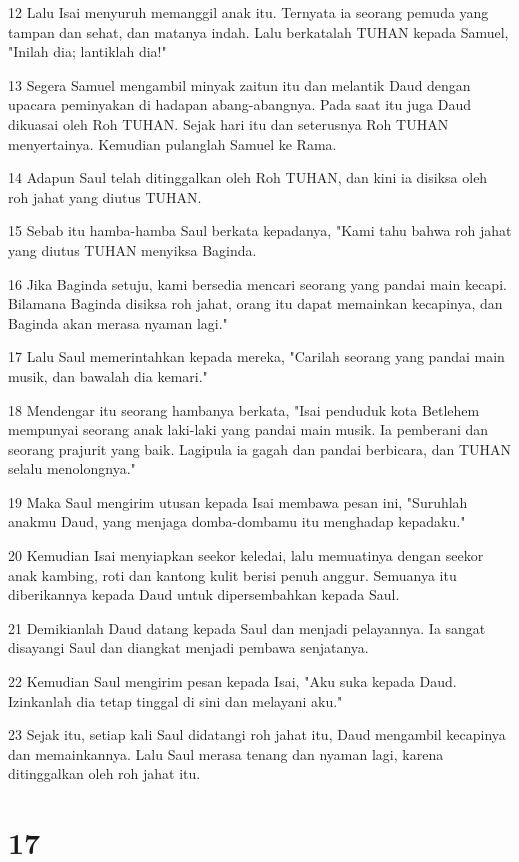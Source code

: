 \par 12 Lalu Isai menyuruh memanggil anak itu. Ternyata ia seorang pemuda yang tampan dan sehat, dan matanya indah. Lalu berkatalah TUHAN kepada Samuel, "Inilah dia; lantiklah dia!"
\par 13 Segera Samuel mengambil minyak zaitun itu dan melantik Daud dengan upacara peminyakan di hadapan abang-abangnya. Pada saat itu juga Daud dikuasai oleh Roh TUHAN. Sejak hari itu dan seterusnya Roh TUHAN menyertainya. Kemudian pulanglah Samuel ke Rama.
\par 14 Adapun Saul telah ditinggalkan oleh Roh TUHAN, dan kini ia disiksa oleh roh jahat yang diutus TUHAN.
\par 15 Sebab itu hamba-hamba Saul berkata kepadanya, "Kami tahu bahwa roh jahat yang diutus TUHAN menyiksa Baginda.
\par 16 Jika Baginda setuju, kami bersedia mencari seorang yang pandai main kecapi. Bilamana Baginda disiksa roh jahat, orang itu dapat memainkan kecapinya, dan Baginda akan merasa nyaman lagi."
\par 17 Lalu Saul memerintahkan kepada mereka, "Carilah seorang yang pandai main musik, dan bawalah dia kemari."
\par 18 Mendengar itu seorang hambanya berkata, "Isai penduduk kota Betlehem mempunyai seorang anak laki-laki yang pandai main musik. Ia pemberani dan seorang prajurit yang baik. Lagipula ia gagah dan pandai berbicara, dan TUHAN selalu menolongnya."
\par 19 Maka Saul mengirim utusan kepada Isai membawa pesan ini, "Suruhlah anakmu Daud, yang menjaga domba-dombamu itu menghadap kepadaku."
\par 20 Kemudian Isai menyiapkan seekor keledai, lalu memuatinya dengan seekor anak kambing, roti dan kantong kulit berisi penuh anggur. Semuanya itu diberikannya kepada Daud untuk dipersembahkan kepada Saul.
\par 21 Demikianlah Daud datang kepada Saul dan menjadi pelayannya. Ia sangat disayangi Saul dan diangkat menjadi pembawa senjatanya.
\par 22 Kemudian Saul mengirim pesan kepada Isai, "Aku suka kepada Daud. Izinkanlah dia tetap tinggal di sini dan melayani aku."
\par 23 Sejak itu, setiap kali Saul didatangi roh jahat itu, Daud mengambil kecapinya dan memainkannya. Lalu Saul merasa tenang dan nyaman lagi, karena ditinggalkan oleh roh jahat itu.

\chapter{17}

